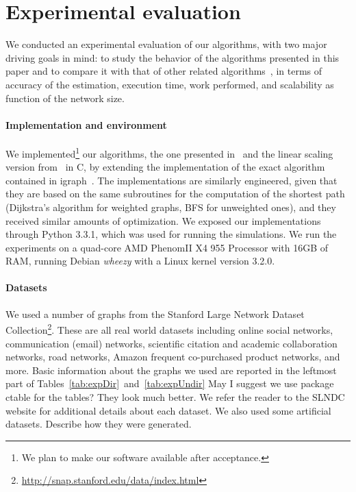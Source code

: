 \section{Experimental evaluation}\label{sec:exper}
We conducted an experimental evaluation of our algorithms, with two major
driving goals in mind: to study the behavior of the algorithms presented in this
paper and to compare it with that of other related
algorithms~\citep{Brandes01,BrandesP07,JacobKLPT05,GeisbergerSS08}, in terms of
accuracy of the estimation, execution time, work performed, and scalability as
function of the network size. 

\paragraph{Implementation and environment}
We implemented\footnote{We plan to make our software available after
acceptance.} our algorithms, the one presented in~\citep{BrandesP07,JacobKLPT05}
and the linear scaling version from~\citep{GeisbergerSS08} in C, by extending
the implementation of the exact algorithm~\citep{Brandes01} contained in
igraph~\citep{igraph}. The implementations are similarly engineered, given that
they are based on the same subroutines for the computation of the shortest path
(Dijkstra's algorithm for weighted graphs, BFS for unweighted ones), and they
received similar amounts of optimization. We exposed our implementations through
Python 3.3.1, which was used for running the simulations. We run the experiments
on a quad-core AMD Phenom\texttrademark II X4 955 Processor with 16GB of RAM,
running Debian \emph{wheezy} with a Linux kernel version 3.2.0.

\paragraph{Datasets} We used a number of graphs from the Stanford Large
Network Dataset
Collection\footnote{\url{http://snap.stanford.edu/data/index.html}}. These are
all real world datasets including online social networks, communication (email)
networks, scientific citation and academic collaboration networks, road
networks, Amazon frequent co-purchased product networks, and more. Basic
information about the graphs we used are reported in the leftmost part of
Tables~\ref{tab:expDir}~and~\ref{tab:expUndir} \XXX May I suggest we use package
ctable for the tables? They look much better. We refer the
reader to the SLNDC website for additional details about each dataset. \XXX We
also used some artificial datasets. Describe how they were generated.

